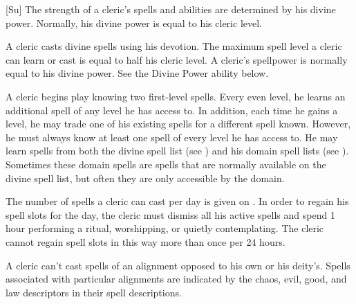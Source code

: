 [Su]
The strength of a cleric's spells and abilities are determined by his divine power.
Normally, his divine power is equal to his cleric level.

A cleric casts divine spells using his devotion.
The maximum spell level a cleric can learn or cast is equal to half his cleric level.
A cleric's spellpower is normally equal to his divine power.
See the Divine Power ability below.

A cleric begins play knowing two first-level spells.
Every even level, he learns an additional spell of any level he has access to.
In addition, each time he gains a level, he may trade one of his existing spells for a different spell known.
However, he must always know at least one spell of every level he has access to.
He may learn spells from both the divine spell list (see ) and his domain spell lists (see ).
Sometimes these domain spells are spells that are normally available on the divine spell list, but often they are only accessible by the domain.

The number of spells a cleric can cast per day is given on .
In order to regain his spell slots for the day, the cleric must dismiss all his active spells and spend 1 hour performing a ritual, worshipping, or quietly contemplating.
The cleric cannot regain spell slots in this way more than once per 24 hours.

A cleric can't cast spells of an alignment opposed to his own or his deity's.
Spells associated with particular alignments are indicated by the chaos, evil, good, and law descriptors in their spell descriptions.

